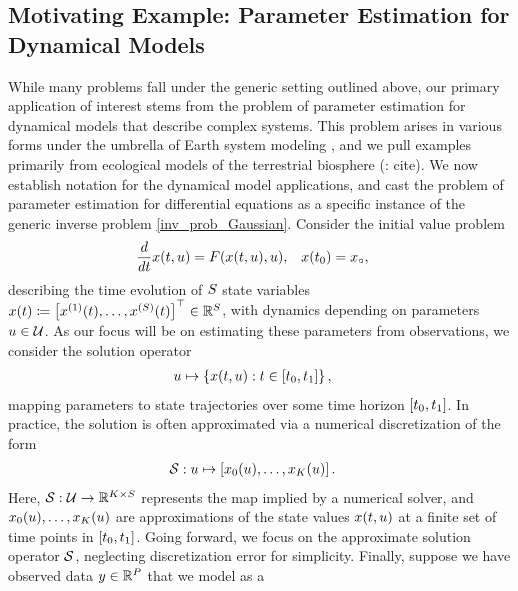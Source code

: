 \documentclass[12pt]{article}
\begin{document}
\subsection{Motivating Example: Parameter Estimation for Dynamical Models}
While many problems fall under the generic setting outlined above, our primary application of interest 
stems from the problem of parameter estimation for dynamical models that describe complex systems. 
This problem arises in various forms under the umbrella of Earth system modeling \citep{ESM_modeling_2pt0}, 
and we pull examples primarily from ecological models of the terrestrial biosphere (\todo: cite). We now 
establish notation for the dynamical model applications, and cast the problem of parameter estimation for 
differential equations as a specific instance of the generic inverse problem \ref{inv_prob_Gaussian}. 
Consider the initial value problem 
\begin{align}
\frac{d}{d\Time} \state(\Time, \Par) &= \odeRHS(\state(\Time, \Par), \Par), &&x(\timeStart) = \stateIC,
\end{align}
describing the time evolution of $\dimState$ state variables 
$\state(\Time) \Def \left[\indexState[1]{\state}(\Time), \dots, \indexState[\dimState]{\state}(\Time)\right]^\top \in \mathbb{R}^{\dimState}$,
with dynamics depending on parameters $\Par \in \parSpace$. As our focus will be on estimating these parameters 
from observations, we consider the solution operator 
\begin{align}
\Par &\mapsto \left\{\state(\Time, \Par) :  \Time \in [\timeStart, \timeEnd] \right\}, 
\end{align}
mapping parameters to state trajectories over some time horizon $[\timeStart, \timeEnd]$. In practice, the solution 
is often approximated via a numerical discretization of the form 
\begin{align}
\solutionOp: \Par &\mapsto \left[\indexTime[0]{\state}(\Par), \dots, \indexTime[\NTimeStep]{\state}(\Par) \right]. 
\end{align}
Here, $\solutionOp: \parSpace \to \R^{\NTimeStep \times \dimState}$ represents the map implied by a numerical solver, 
and $\indexTime[0]{\state}(\Par), \dots, \indexTime[\NTimeStep]{\state}(\Par)$ are approximations of the state 
values $\state(\Time, \Par)$ at a finite set of time points in $[\timeStart, \timeEnd]$. 
Going forward, we focus on the approximate solution operator $\solutionOp$, neglecting discretization error 
for simplicity. Finally, suppose we have observed data $\obs \in \R^{\dimObs}$ that we model as a
\end{document}

